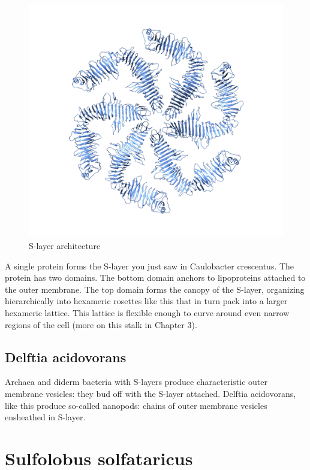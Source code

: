 \documentclass[]{tufte-book}
\begin{document}
\begin{figure}
\includegraphics{img/02_schematic/2_6_1_SLayerTop} \caption[S-layer architecture]{S-layer architecture}\label{fig:2-6-1}
\end{figure}

A single protein forms the S-layer you just saw in Caulobacter crescentus. The protein has two domains. The bottom domain anchors to lipoproteins attached to the outer membrane. The top domain forms the canopy of the S-layer, organizing hierarchically into hexameric rosettes like this that in turn pack into a larger hexameric lattice. This lattice is flexible enough to curve around even narrow regions of the cell (more on this stalk in Chapter 3).

\hypertarget{Nanopods}{%
\subsection{Delftia acidovorans}\label{Nanopods}}

Archaea and diderm bacteria with S-layers produce characteristic outer membrane vesicles: they bud off with the S-layer attached. Delftia acidovorans, like this produce so-called nanopods: chains of outer membrane vesicles ensheathed in S-layer.

\hypertarget{htmlwidget-fce3d846cf391424a0e4}{}

\hypertarget{sulfolobus-solfataricus}{%
\section{Sulfolobus solfataricus}\label{sulfolobus-solfataricus}}
\end{document}
